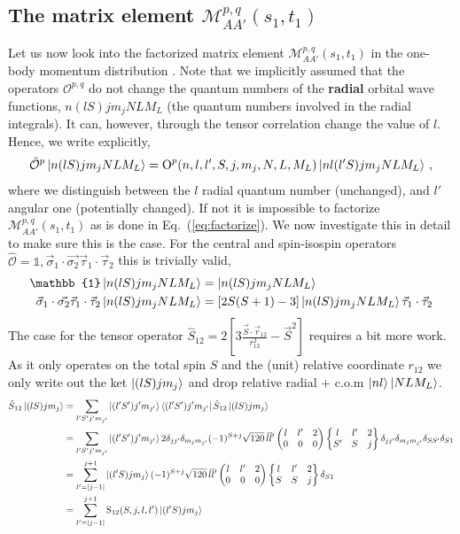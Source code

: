 \documentclass[10pt]{article}
\def\threej#1{\inthreej(#1)}
\def\inthreej(#1,#2,#3,#4,#5,#6){\begin{pmatrix}#1 & #2 & #3 \\ #4 & #5 & #6 \end{pmatrix}}
\def\sixj#1{\insixj(#1)}
\def\insixj(#1,#2,#3,#4,#5,#6){\begin{Bmatrix}#1 & #2 & #3 \\ #4 & #5 & #6 \end{Bmatrix}}
\begin{document}
\subsection{The matrix element $\mathcal{M}_{A A'}^{p,q}(s_1,t_1)$}
Let us now look into the factorized matrix element $\mathcal{M}_{A 
A'}^{p,q}(s_1,t_1)$ in the one-body momentum distribution . Note that we 
implicitly assumed that the operators $\mathcal{O}^{p,q}$ do not change the 
quantum numbers of the \textbf{radial} orbital wave functions, $ n (lS) j m_j N 
L M_L$ (the quantum numbers involved in the radial integrals).  It can, 
however, through the tensor correlation change the value of $l$. Hence, we 
write explicitly,
\begin{align}\label{eq:matrixel}
	\hat{\mathcal{O}}^{p} \ket{ n (lS) j m_j N L M_L } = 
\text{O}^{p}(n,l,l',S,j,m_j,N,L,M_L) \ket{ nl (l'S) j m_j N L M_L }\,,
\end{align}
where we distinguish between the $l$ radial quantum number (unchanged), and 
$l'$ angular one (potentially changed).
If not it is impossible to factorize $\mathcal{M}_{A A'}^{p,q}(s_1,t_1)$ as is 
done in Eq.~(\ref{eq:factorize}). We now investigate this in detail to make 
sure this is the case.
For the central and spin-isospin operators $\hat{\mathcal{O}} = \mathbb{1}, 
\vec{\sigma}_{1} \cdot \vec{\sigma_{2}} \vec{ \tau}_{1} \cdot \vec{ \tau}_{2} $ 
this is trivially valid,
\begin{align*}
	\mathbb{1} \ket{ n (lS) j m_j N L M_L } &= \ket{ n (lS) j m_j N L M_L } 
\\
	\vec{\sigma}_{1} \cdot \vec{\sigma_{2}} \vec{ \tau}_{1} \cdot \vec{ 
\tau}_{2} \ket{ n (lS) j m_j N L M_L } &= \left[ 2 S(S+1) - 3 \right] \ket{ n 
(lS) j m_j N L M_L } \vec{ \tau}_{1} \cdot \vec{ \tau}_{2}
\end{align*}
The case for the tensor operator $\hat{S}_{12} = 2 \left[ 3 \frac{ \vec{S} 
\cdot 
\vec{r}_{12}}{r_{12}^{2}} - \vec{S}^{2} \right]$ requires a bit more work. As 
it only operates on the total spin $S$ and the (unit) relative coordinate 
$r_{12}$ we only write out the ket $\ket{ (l S) j m_j}$ and drop relative 
radial + c.o.m $ \ket{nl} \ket{ N L M_L}$.
\begin{align*}
	\hat{S}_{12} \ket{ (lS) j m_j} &= \sum_{l' S' j' m_{j'}} \ket{ (l' S') 
j' m_{j'} } \bra{ (l' S') j' m_{j'}} \hat{S}_{12} \ket{ (lS) j m_j} \\
	&= \sum_{l' S' j' m_{j'}} \ket{ (l' S') j' m_{j'} } 2 \delta_{jj'} 
\delta_{m_j m_{j'}} (-1)^{S+j} \sqrt{ 120 } \, \hat{l} \hat{l}' 
\threej{l,l',2,0,0,0} \sixj{l,l',2,S',S,j} \delta_{jj'} \delta_{m_j m_{j'}} 
\delta_{S S'} \delta_{S1} \\
	&= \sum_{l'=|j-1|}^{j+1} \ket{ (l' S) j m_j } (-1)^{S+j} \sqrt{ 120 } \, 
\hat{l} \hat{l}' \threej{l,l',2,0,0,0} \sixj{l,l',2,S,S,j} \delta_{S1} \\
	&= \sum_{l'=|j-1|}^{j+1} \text{S}_{12}(S,j,l,l') \ket{ (l' S) j m_j }
\end{align*}
\end{document}
